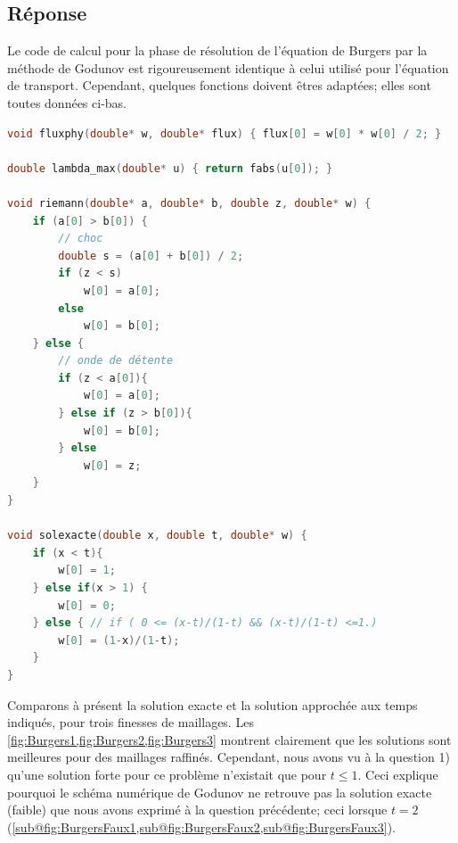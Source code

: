 \documentclass[
	french,
	11pt, %
]{fphw}
\begin{document}
\subsection*{Réponse}

Le code de calcul pour la phase de résolution de l'équation de Burgers par la méthode de Godunov est rigoureusement identique à celui utilisé pour l'équation de transport. Cependant, quelques fonctions doivent êtres adaptées; elles sont toutes données ci-bas.


\begin{lstlisting}[language=C, caption={Flux physique, vitesse maximale, solution du problème de Riemann, et solution exacte pour l'équation de Burgers},breaklines]
void fluxphy(double* w, double* flux) { flux[0] = w[0] * w[0] / 2; }

double lambda_max(double* u) { return fabs(u[0]); }

void riemann(double* a, double* b, double z, double* w) {
	if (a[0] > b[0]) {
		// choc
		double s = (a[0] + b[0]) / 2;
		if (z < s)
			w[0] = a[0];
		else
			w[0] = b[0];
	} else {
		// onde de détente
		if (z < a[0]){
			w[0] = a[0];
		} else if (z > b[0]){
			w[0] = b[0];
		} else
			w[0] = z;
	}
}

void solexacte(double x, double t, double* w) {
	if (x < t){
		w[0] = 1;
	} else if(x > 1) {
		w[0] = 0;
	} else { // if ( 0 <= (x-t)/(1-t) && (x-t)/(1-t) <=1.)
		w[0] = (1-x)/(1-t);
	}
}	
\end{lstlisting}

\noindent Comparons à présent la solution exacte et la solution approchée aux temps indiqués, pour trois finesses de maillages. Les \cref{fig:Burgers1,fig:Burgers2,fig:Burgers3} montrent clairement que les solutions sont meilleures pour des maillages raffinés. Cependant, nous avons vu à la question 1) qu'une solution forte pour ce problème n'existait que pour $t\leq1$. Ceci explique pourquoi le schéma numérique de Godunov ne retrouve pas la solution exacte (faible) que nous avons exprimé à la question précédente; ceci lorsque $t=2$ (\cref{sub@fig:BurgersFaux1,sub@fig:BurgersFaux2,sub@fig:BurgersFaux3}).
\end{document}
